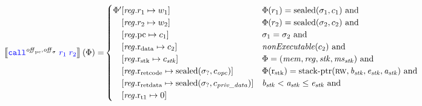 \documentclass[a4paper]{article}
\begin{document}
\begin{align*}
  \sem{\scall{\offpc,\offsigma}{\src{r_1}}{\src{r_2}}}(\Phi) = & 
                                               \begin{cases}
                                                 \Phi'
                                                 \arraycolsep=0pt
                                                 \begin{array}[t]{rl}
                                                   &\updReg{r_1}{w_1} \\
                                                        &\updReg{r_2}{w_2} \\
                                                        &\updReg{\pcreg}{c_1}\\
                                                        &\updReg{\rdata}{c_2}\\
                                                        &\updReg{\rstk}{c_\stk}\\
                                                        &\updReg{\rretc}{\sealed{\sigma_?,c_\opc}}\\
                                                        &\updReg{\rretd}{\sealed{\sigma_?,c_\var{priv\_data}}}\\
                                                        &\updReg{\rtmp{1}}{0}
                                                 \end{array}
                                                 & 
                                                 \arraycolsep=0pt
                                                 \begin{array}[t]{l}
                                                   \Phi(r_1) = \sealed{\sigma_1,c_1} \tand \\
                                                   \Phi(r_2) = \sealed{\sigma_2,c_2} \tand \\
                                                   \sigma_1 = \sigma_2 \tand \\
                                                   \nonExec{c_2} \tand\\
                                                   \Phi = (\mem,\reg,\stk,\ms_\stk) \tand\\
                                                   \Phi(\rstk) = \stkptr{\rw,\baddr_\stk,\eaddr_\stk,\aaddr_\stk} \tand \\
                                                   \baddr_\stk < \aaddr_\stk \leq \eaddr_\stk \tand \\

\end{array}
\end{cases}
\end{align*}
\end{document}
